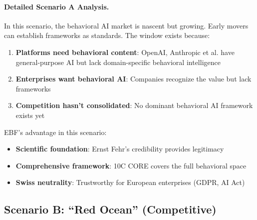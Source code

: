 \paragraph{Detailed Scenario A Analysis.}

In this scenario, the behavioral AI market is nascent but growing. Early movers can establish frameworks as standards. The window exists because:

\begin{enumerate}
\item \textbf{Platforms need behavioral content}: OpenAI, Anthropic et al. have general-purpose AI but lack domain-specific behavioral intelligence
\item \textbf{Enterprises want behavioral AI}: Companies recognize the value but lack frameworks
\item \textbf{Competition hasn't consolidated}: No dominant behavioral AI framework exists yet
\end{enumerate}

EBF's advantage in this scenario:
\begin{itemize}
\item \textbf{Scientific foundation}: Ernst Fehr's credibility provides legitimacy
\item \textbf{Comprehensive framework}: 10C CORE covers the full behavioral space
\item \textbf{Swiss neutrality}: Trustworthy for European enterprises (GDPR, AI Act)
\end{itemize}


\subsection{Scenario B: ``Red Ocean'' (Competitive)}

